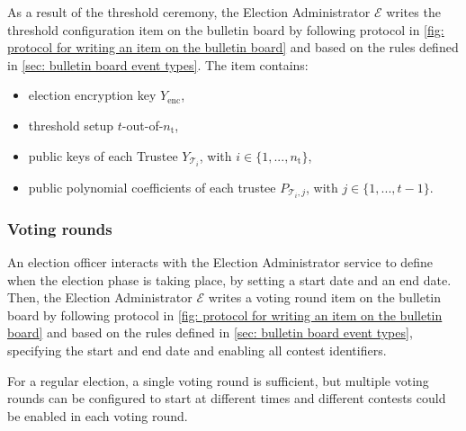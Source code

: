 As a result of the threshold ceremony, the Election Administrator $\mathcal{E}$ writes the threshold configuration item on the bulletin board by following protocol in \cref{fig: protocol for writing an item on the bulletin board} and based on the rules defined in \cref{sec: bulletin board event types}. The item contains:
\begin{itemize}
    \item election encryption key $Y_\mathrm{enc}$,
    \item threshold setup $t$-out-of-$n_\mathrm{t}$,
    \item public keys of each Trustee $Y_{\mathcal{T}_i}$, with $i \in \{1, ..., n_\mathrm{t}\}$,
    \item public polynomial coefficients of each trustee $P_{\mathcal{T}_i,j}$, with $j \in \{1, ..., t-1 \}$.
\end{itemize}


\subsubsection{Voting rounds} \label{sec: voting rounds}
An election officer interacts with the Election Administrator service to define when the election phase is taking place, by setting a start date and an end date. Then, the Election Administrator $\mathcal{E}$ writes a voting round item on the bulletin board by following protocol in \cref{fig: protocol for writing an item on the bulletin board} and based on the rules defined in \cref{sec: bulletin board event types}, specifying the start and end date and enabling all contest identifiers.

For a regular election, a single voting round is sufficient, but multiple voting rounds can be configured to start at different times and different contests could be enabled in each voting round.
